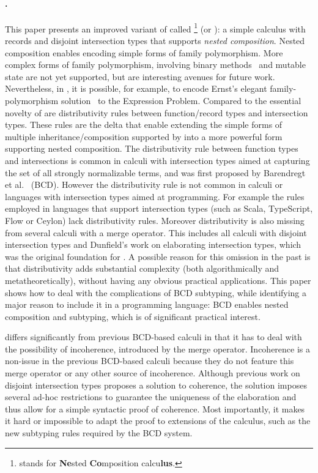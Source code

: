 \paragraph{\name.}
This paper presents an improved variant of \oname called
\name\footnote{\name stands for \textbf{Ne}sted \textbf{Co}mposition
  calcu\textbf{lus}.} (or \namee): a simple calculus with records and
disjoint intersection types that supports \emph{nested composition}. Nested composition enables
encoding simple forms of family polymorphism. More complex forms of
family polymorphism, involving binary methods~\cite{bruce1995binary} and mutable state are
not yet supported, but are interesting avenues for future work.
Nevertheless, in \name, it is
possible, for example, to encode Ernst's elegant family-polymorphism solution~\cite{Ernst_2001} to
the Expression Problem. 
Compared to \oname the essential novelty of \name are
distributivity rules between function/record types and intersection
types. These rules are the delta that enable extending the simple
forms of multiple inheritance/composition supported by \oname into a
more powerful form supporting nested composition. The distributivity
rule between function types and intersections is
common in calculi with intersection types aimed at capturing the set
of all strongly normalizable terms, and was first proposed by
Barendregt et al.~\cite{Barendregt_1983} (BCD). However the
distributivity rule is not common in calculi or languages with intersection types
aimed at programming. For example the rules employed in languages that
support intersection types (such as Scala, TypeScript, Flow or Ceylon)
lack distributivity rules. Moreover distributivity is also missing from
several calculi with a merge operator. This includes all calculi with
disjoint intersection types and Dunfield's work on elaborating
intersection types, which was the original foundation for \oname.
A possible reason for this omission in the past is that distributivity adds
substantial complexity (both algorithmically and metatheoretically), without having any obvious practical
applications. 
This paper shows how to deal with the complications of BCD subtyping, while
identifying a major reason to include it in a programming
language: BCD enables nested composition and subtyping, which is of
significant practical interest.


\name differs significantly from previous BCD-based calculi in that it has to
deal with the possibility of incoherence, introduced by the merge operator. Incoherence
is a non-issue in the previous BCD-based calculi because they do not feature
this merge operator or any other source of incoherence.
Although previous work on disjoint intersection types
proposes a solution to coherence, the solution imposes several ad-hoc restrictions
to guarantee the uniqueness of the elaboration and thus allow for a simple
syntactic proof of coherence. Most
importantly, it makes it hard or impossible to adapt the proof to extensions of
the calculus, such as the new subtyping rules required by the BCD system.

